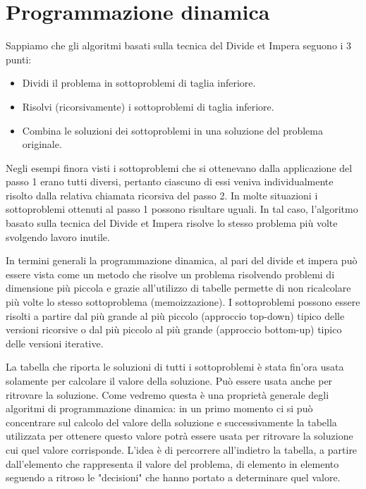 \chapter{Programmazione dinamica}

Sappiamo che gli algoritmi basati sulla tecnica del Divide et Impera seguono i 3 punti:
\begin{itemize}
    \item Dividi il problema in sottoproblemi di taglia inferiore.
    \item Risolvi (ricorsivamente) i sottoproblemi di taglia inferiore.
    \item Combina le soluzioni dei sottoproblemi in una soluzione del problema originale. 
\end{itemize}

Negli esempi finora visti i sottoproblemi che si ottenevano dalla applicazione del passo 1 erano tutti diversi, pertanto ciascuno di essi veniva individualmente risolto dalla relativa chiamata ricorsiva del passo 2. In molte situazioni i sottoproblemi ottenuti al passo 1 possono risultare uguali. In tal caso, l'algoritmo basato sulla tecnica del Divide et Impera risolve lo stesso problema più volte svolgendo lavoro inutile.

\begin{redbar}
In termini generali la programmazione dinamica, al pari del divide et impera può essere vista come un metodo che risolve un problema risolvendo problemi di dimensione più piccola e grazie all'utilizzo di tabelle permette di non ricalcolare più volte lo stesso sottoproblema (memoizzazione). I sottoproblemi possono essere risolti a partire dal più grande al più piccolo (approccio top-down) tipico delle versioni ricorsive o dal più piccolo al più grande (approccio bottom-up) tipico delle versioni iterative.
\end{redbar}

La tabella che riporta le soluzioni di tutti i sottoproblemi è stata fin'ora usata solamente per calcolare il valore della soluzione. Può essere usata anche per ritrovare la soluzione. Come vedremo questa è una proprietà generale degli algoritmi di programmazione dinamica: in un primo momento ci si può concentrare sul calcolo del valore della soluzione e successivamente la tabella utilizzata per ottenere questo valore potrà essere usata per ritrovare la soluzione cui quel valore corrisponde. L'idea è di percorrere all'indietro la tabella, a partire dall'elemento che
rappresenta il valore del problema, di elemento in elemento seguendo a ritroso le "decisioni" che hanno portato a determinare quel valore.


